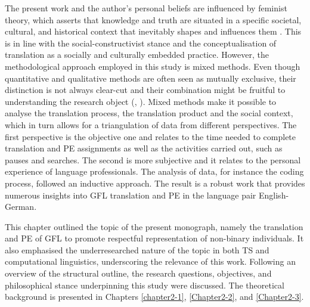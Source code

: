 The present work and the author’s personal beliefs are influenced by feminist theory, which asserts that knowledge and truth are situated in a specific societal, cultural, and historical context that inevitably shapes and influences them \citep{haraway1998science}. This is in line with the social-constructivist stance and the conceptualisation of translation as a socially and culturally embedded practice. However, the methodological approach employed in this study is mixed methods. Even though quantitative and qualitative methods are often seen as mutually exclusive, their distinction is not always clear-cut and their combination might be fruitful to understanding the research object (\cite[5]{luker2009salsa}, \cite[37]{bryman2016social}). Mixed methods make it possible to analyse the translation process, the translation product and the social context, which in turn allows for a triangulation of data from different perspectives. The first perspective is the objective one and relates to the time needed to complete translation and PE assignments as well as the activities carried out, such as pauses and searches. The second is more subjective and it relates to the personal experience of language professionals. The analysis of data, for instance the coding process, followed an inductive approach. The result is a robust work that provides numerous insights into GFL translation and PE in the language pair English-German.

This chapter outlined the topic of the present monograph, namely the translation and PE of GFL to promote respectful representation of non-binary individuals. It also emphasised the underresearched nature of the topic in both TS and computational linguistics, underscoring the relevance of this work. Following an overview of the structural outline, the research questions, objectives, and philosophical stance underpinning this study were discussed. The theoretical background is presented in Chapters \ref{chapter2-1}, \ref{Chapter2-2}, and \ref{Chapter2-3}.


